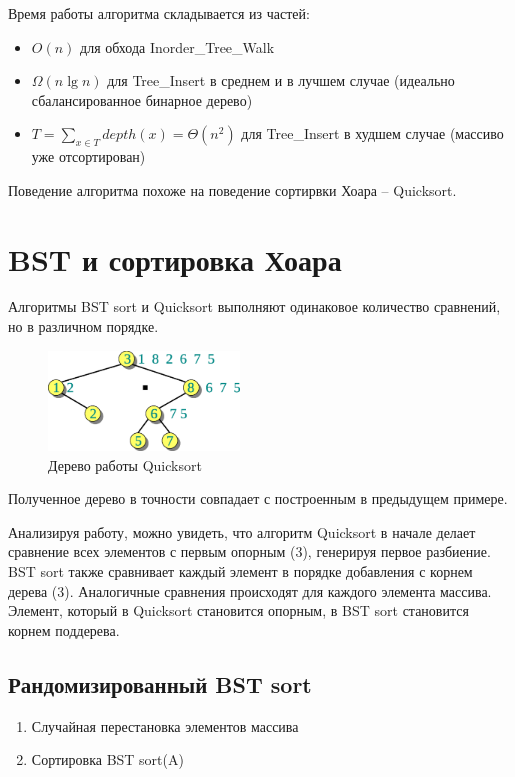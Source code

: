 \documentclass[11pt]{article}
\begin{document}
Время работы алгоритма складывается из частей:
\begin{itemize}
\item $O(n)$ для обхода Inorder\_Tree\_Walk
\item $\Omega(n \lg n)$ для Tree\_Insert в среднем и в лучшем случае (идеально сбалансированное бинарное дерево)
\item $T = \sum_{x \in T} depth(x) = \Theta(n^2)$ для Tree\_Insert в худшем случае (массиво уже отсортирован)
\end{itemize}

Поведение алгоритма похоже на поведение сортирвки Хоара -- Quicksort.

\section{BST и сортировка Хоара}

Алгоритмы BST sort и Quicksort выполняют одинаковое количество сравнений, но в различном порядке.
\begin{figure}[ht]
  \centering
  \includegraphics[width=2in]{lecture9/qs_tree.eps}
  \caption{Дерево работы Quicksort}
  \label{fig:qs_tree}
\end{figure}

Полученное дерево в точности совпадает с построенным в предыдущем примере.

Анализируя работу, можно увидеть, что алгоритм Quicksort в начале делает сравнение всех элементов с первым опорным (3), генерируя первое разбиение. BST sort также сравнивает каждый элемент в порядке добавления с корнем дерева (3). Аналогичные сравнения происходят для каждого элемента массива. Элемент, который в Quicksort становится опорным, в BST sort становится корнем поддерева.

\subsection{Рандомизированный BST sort}
\begin{enumerate}
\item Случайная перестановка элементов массива
\item Сортировка BST sort(A)
\end{enumerate}
\end{document}
